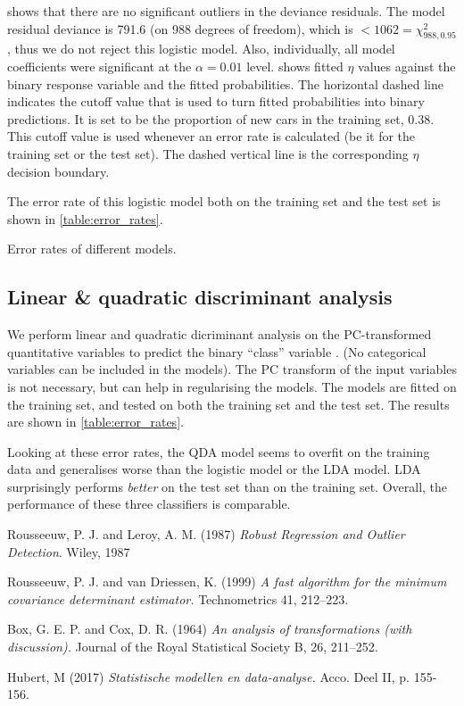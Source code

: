\documentclass[a4paper, 12pt]{article}
\newcommand{\varr}[1]{\texttt{\StrSubstitute{#1}{ }{\_\allowbreak}}}
\newcommand{\wide}[1]{\makebox[\textwidth][c]{#1}%
}
\begin{document}
 shows that there are no significant outliers in the deviance residuals. The model residual deviance is 791.6 (on 988 degrees of freedom), which is $ < 1062 = \chi^2_{988,0.95} $, thus we do not reject this logistic model. Also, individually, all model coefficients were significant at the $ \alpha = 0.01 $ level.  shows fitted $\eta$ values against the binary response variable and the fitted probabilities. The horizontal dashed line indicates the cutoff value that is used to turn fitted probabilities into binary predictions. It is set to be the proportion of new cars in the training set, 0.38. This cutoff value is used whenever an error rate is calculated (be it for the training set or the test set). The dashed vertical line is the corresponding $ \eta $ decision boundary.

The error rate of this logistic model both on the training set and the test set is shown in \cref{table:error_rates}.

\begin{table}
\centering
\wide{}
\caption{Error rates of different models.}
\label{table:error_rates}
\end{table}

\subsection*{Linear \& quadratic discriminant analysis}

We perform linear and quadratic dicriminant analysis on the PC-transformed quantitative variables to predict the binary ``class'' variable \varr{euro standard}. (No categorical variables can be included in the models). The PC transform of the input variables is not necessary, but can help in regularising the models. The models are fitted on the training set, and tested on both the training set and the test set. The results are shown in \cref{table:error_rates}.

Looking at these error rates, the QDA model seems to overfit on the training data and generalises worse than the logistic model or the LDA model. LDA surprisingly performs \textit{better} on the test set than on the training set. Overall, the performance of these three classifiers is comparable.



\FloatBarrier
\begin{thebibliography}{9}
Rousseeuw, P. J. and Leroy, A. M.
(1987)
\textit{Robust Regression and Outlier Detection}. 
Wiley, 1987

Rousseeuw, P. J. and van Driessen, K.
(1999)
\textit{A fast algorithm for the minimum covariance determinant estimator.}
Technometrics 41, 212–223.

Box, G. E. P. and Cox, D. R.
(1964)
\textit{An analysis of transformations (with discussion).} Journal of the Royal Statistical Society B, 26, 211–252.

Hubert, M
(2017)
\textit{Statistische modellen en data-analyse.}
Acco. Deel II, p. 155-156.
\end{thebibliography}
\end{document}

